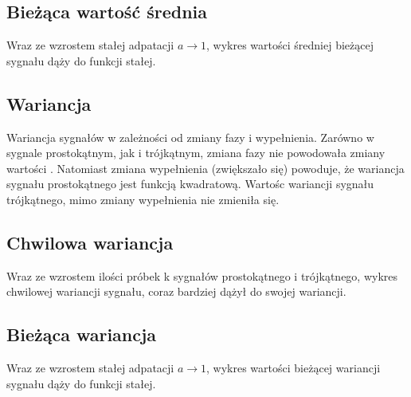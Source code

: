 \documentclass[wide,a4paper,titlepage,12pt]{mwart}
\begin{document}
    \subsection{Bieżąca wartość średnia}
    Wraz ze wzrostem stałej adpatacji $a \rightarrow 1$, wykres wartości  średniej  bieżącej sygnału dąży do funkcji stałej.

    \subsection{Wariancja}
    Wariancja sygnałów w zależności od zmiany fazy i wypełnienia. Zarówno w sygnale prostokątnym, jak i trójkątnym, zmiana fazy nie powodowała zmiany wartości . Natomiast zmiana wypełnienia (zwiększało się) powoduje, że wariancja sygnału prostokątnego jest funkcją kwadratową. Wartośc wariancji sygnału trójkątnego, mimo zmiany wypełnienia nie zmieniła się. 

    \subsection{Chwilowa wariancja}
    Wraz ze wzrostem ilości próbek k sygnałów prostokątnego i trójkątnego, wykres chwilowej wariancji sygnału, coraz bardziej dążył do swojej wariancji.

    \subsection{Bieżąca wariancja}
    Wraz ze wzrostem stałej adpatacji $a \rightarrow 1$, wykres wartości bieżącej wariancji sygnału dąży do funkcji stałej.



  
\end{document}
